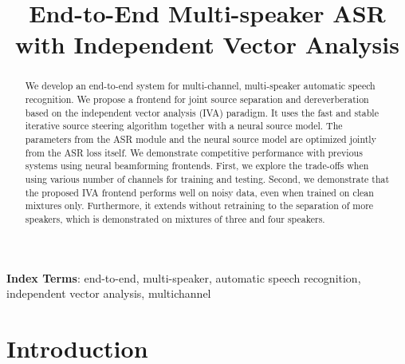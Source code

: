 \documentclass[a4paper]{article}
\title{End-to-End Multi-speaker ASR with Independent Vector Analysis}
\begin{document}

\maketitle
% 
\begin{abstract}
  We develop an end-to-end system for multi-channel, multi-speaker automatic speech recognition.
  We propose a frontend for joint source separation and dereverberation based on the independent vector analysis (IVA) paradigm.
  It uses the fast and stable iterative source steering algorithm together with a neural source model.
  The parameters from the ASR module and the neural source model are optimized jointly from the ASR loss itself.
  We demonstrate competitive performance with previous systems using neural beamforming frontends.
  First, we explore the trade-offs when using various number of channels for training and testing.
  Second, we demonstrate that the proposed IVA frontend performs well on noisy data, even when trained on clean mixtures only.
  Furthermore, it extends without retraining to the separation of more speakers, which is demonstrated on mixtures of three and four speakers.
\end{abstract}
\noindent\textbf{Index Terms}: end-to-end, multi-speaker, automatic speech recognition, independent vector analysis, multichannel

\section{Introduction}
\end{document}
